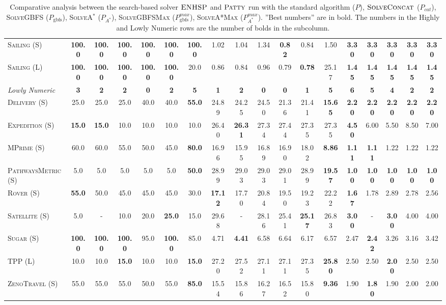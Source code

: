 \documentclass[11pt,landscape]{article}
\begin{document}
\begin{table*}[tb]
{\begin{tabular}{|l||cccccc||cccccc||ccccc||}
\textsc{Sailing} (S)&\textbf{100.0}&\textbf{100.0}&\textbf{100.0}&\textbf{100.0}&\textbf{100.0}&\textbf{100.0}&1.02&1.04&1.34&\textbf{0.82}&0.84&1.50&\textbf{3.30}&\textbf{3.30}&\textbf{3.30}&\textbf{3.30}&\textbf{3.30}\\
\textsc{Sailing} (L)&\textbf{100.0}&\textbf{100.0}&\textbf{100.0}&\textbf{100.0}&\textbf{100.0}&20.0&0.86&0.84&0.96&0.79&\textbf{0.78}&25.17&\textbf{1.45}&\textbf{1.45}&\textbf{1.45}&\textbf{1.45}&\textbf{1.45}
\\\hline
\textit{Lowly Numeric}&\textbf{3}&\textbf{2}&\textbf{2}&\textbf{0}&\textbf{2}&\textbf{5}&\textbf{1}&\textbf{2}&\textbf{0}&\textbf{0}&\textbf{1}&\textbf{5}&\textbf{6}&\textbf{5}&\textbf{4}&\textbf{2}&\textbf{2}\\\hline
\textsc{Delivery} (S)&25.0&25.0&25.0&40.0&40.0&\textbf{55.0}&24.89&24.25&24.50&21.36&21.41&\textbf{15.65}&\textbf{2.20}&\textbf{2.20}&\textbf{2.20}&\textbf{2.20}&\textbf{2.20}\\
\textsc{Expedition} (S)&\textbf{15.0}&\textbf{15.0}&10.0&10.0&10.0&10.0&26.40&\textbf{26.31}&27.34&27.44&27.35&27.35&\textbf{4.50}&6.00&5.50&8.50&7.00\\
\textsc{MPrime} (S)&60.0&60.0&55.0&50.0&45.0&\textbf{80.0}&16.96&15.95&16.89&16.90&18.02&\textbf{8.86}&\textbf{1.11}&\textbf{1.11}&1.22&1.22&1.22\\
\textsc{PathwaysMetric} (S)&5.0&5.0&5.0&5.0&5.0&\textbf{50.0}&28.99&29.03&29.03&29.01&28.99&\textbf{19.57}&\textbf{1.00}&\textbf{1.00}&\textbf{1.00}&\textbf{1.00}&\textbf{1.00}\\
\textsc{Rover} (S)&\textbf{55.0}&50.0&45.0&45.0&45.0&30.0&\textbf{17.12}&17.70&20.84&19.50&19.23&22.22&\textbf{1.67}&1.78&2.89&2.78&2.56\\
\textsc{Satellite} (S)&5.0&-&10.0&20.0&\textbf{25.0}&15.0&29.68&-&28.16&25.41&\textbf{25.17}&26.83&\textbf{3.00}&-&\textbf{3.00}&4.00&4.00\\
\textsc{Sugar} (S)&\textbf{100.0}&\textbf{100.0}&\textbf{100.0}&95.0&\textbf{100.0}&85.0&4.71&\textbf{4.41}&6.58&6.64&6.17&6.57&2.47&\textbf{2.42}&3.26&3.16&3.42\\
\textsc{TPP} (L)&10.0&10.0&\textbf{15.0}&10.0&10.0&\textbf{15.0}&27.20&27.52&27.11&27.11&27.35&\textbf{25.80}&2.50&2.50&\textbf{2.00}&2.50&2.50\\
\textsc{ZenoTravel} (S)&55.0&55.0&55.0&50.0&55.0&\textbf{85.0}&15.54&15.86&16.27&16.52&15.80&\textbf{9.36}&1.90&\textbf{1.80}&1.90&2.00&2.00
\\\hline

        \end{tabular}}
        \caption{Comparative analysis between the search-based solver $\textsc{ENHSP}$ and  $\textsc{Patty}$ run with the standard algorithm ($P$),  $\textsc{SolveConcat}$ ($P_{cat}$), \textsc{SolveGBFS} ($P_\text{gbfs}$), \textsc{SolveA}$^*$ ($P_{A^*}$), \textsc{SolveGBFSMax} ($P_\text{gbfs}^{max}$), \textsc{SolveA*Max} ($P_{A^*}^{max}$). ''Best numbers'' are in bold.  The numbers in the Highly and Lowly Numeric rows are the number of bolds in the subcolumn.}
        \label{tab:experiments}
        \end{table*}
        
\end{document}
